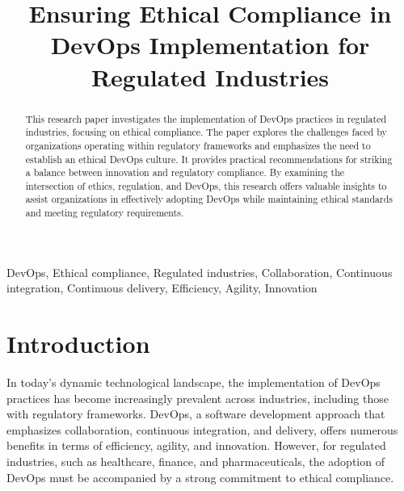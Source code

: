\documentclass[conference]{IEEEtran}
\begin{document}
\title{Ensuring Ethical Compliance in DevOps Implementation for Regulated Industries}

\author{
}

\maketitle

\begin{abstract}

This research paper investigates the implementation of DevOps practices in regulated industries, focusing on ethical compliance. The paper explores the challenges faced by organizations operating within regulatory frameworks and emphasizes the need to establish an ethical DevOps culture. It provides practical recommendations for striking a balance between innovation and regulatory compliance. By examining the intersection of ethics, regulation, and DevOps, this research offers valuable insights to assist organizations in effectively adopting DevOps while maintaining ethical standards and meeting regulatory requirements.

\end{abstract}

\begin{IEEEkeywords}
DevOps, Ethical compliance, Regulated industries, Collaboration, Continuous integration, Continuous delivery, Efficiency, Agility, Innovation
\end{IEEEkeywords}

\section{Introduction}
In today's dynamic technological landscape, the implementation of DevOps practices has become increasingly prevalent across industries, including those with regulatory frameworks. DevOps, a software development approach that emphasizes collaboration, continuous integration, and delivery, offers numerous benefits in terms of efficiency, agility, and innovation. However, for regulated industries, such as healthcare, finance, and pharmaceuticals, the adoption of DevOps must be accompanied by a strong commitment to ethical compliance.
\end{document}
